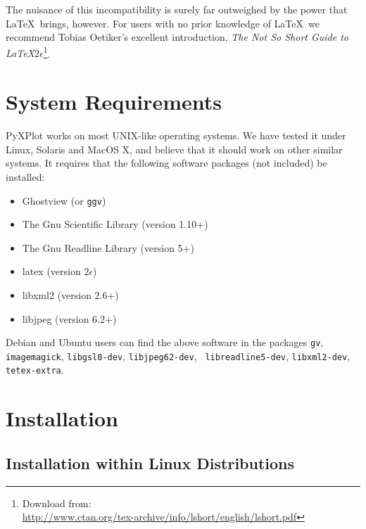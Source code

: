 \noindent The nuisance of this incompatibility is surely far outweighed by the
power that \LaTeX\ brings, however. For users with no prior knowledge of
\LaTeX\ we recommend Tobias Oetiker's excellent
introduction, {\it The Not So Short Guide to \LaTeX $2\epsilon$}\footnote{Download from:\\
\url{http://www.ctan.org/tex-archive/info/lshort/english/lshort.pdf}}.

\section{System Requirements}

PyXPlot works on most UNIX-like operating systems. We have tested it under
Linux, Solaris and MacOS X, and believe that it
should work on other similar systems. It requires that the following software
packages (not included) be installed:

\vspace{0.5cm}
\begin{itemize}
\item Ghostview (or {\tt ggv}) 
\item The Gnu Scientific Library (version 1.10+) 
\item The Gnu Readline Library (version 5+) 
\item latex (version $2\epsilon$) 
\item libxml2 (version 2.6+) 
\item libjpeg (version 6.2+) 
\end{itemize}
\vspace{0.5cm}

Debian and Ubuntu users can find the above software in the packages {\tt gv},
{\tt imagemagick}, {\tt libgsl0-dev}, {\tt libjpeg62-dev}, {\tt
libreadline5-dev}, {\tt libxml2-dev}, {\tt tetex-extra}.

\section{Installation}

\subsection{Installation within Linux Distributions}

